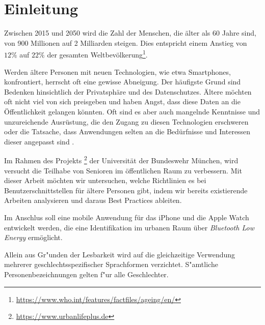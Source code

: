 \chapter{Einleitung}

Zwischen 2015 und 2050 wird die Zahl der Menschen, die älter als 60 Jahre sind, von 900 Millionen auf 2 Milliarden steigen. Dies entspricht einem Anstieg von $ 12 \% $ auf $ 22 \% $ der gesamten Weltbevölkerung\footnote{\url{https://www.who.int/features/factfiles/ageing/en/}}.

Werden ältere Personen mit neuen Technologien, wie etwa Smartphones, konfrontiert, herrscht oft eine gewisse Abneigung. Der häufigste Grund sind Bedenken hinsichtlich der Privatsphäre und des Datenschutzes. Ältere möchten oft nicht viel von sich preisgeben und haben Angst, dass diese Daten an die Öffentlichkeit gelangen könnten. Oft sind es aber auch mangelnde Kenntnisse und unzureichende Ausrüstung, die den Zugang zu diesen Technologien erschweren oder die Tatsache, dass Anwendungen selten an die Bedürfnisse und Interessen dieser angepasst sind \cite{Almeida:2015:Recommendations-for-the-Development-of-Web-Interfaces}\cite{Boll:2015:User-Interfaces-with}\cite{Leonardi:2010:An-Exploratory-Study-of-a-Touch-Based}.

Im Rahmen des Projekts \footnote{\url{https://www.urbanlifeplus.de}} der Universität der Bundeswehr München, wird versucht die Teilhabe von Senioren im öffentlichen Raum zu verbessern. Mit dieser Arbeit möchten wir untersuchen, welche Richtlinien es bei Benutzerschnittstellen für ältere Personen gibt, indem wir bereits existierende Arbeiten analysieren und daraus Best Practices ableiten.

Im Anschlus soll eine mobile Anwendung für das iPhone und die Apple Watch entwickelt werden, die eine Identifikation im urbanen Raum über \emph{Bluetooth Low Energy} ermöglicht.

Allein aus Gr"unden der Lesbarkeit wird auf die gleichzeitige Verwendung mehrerer geschlechtsspezifischer Sprachformen verzichtet. S"amtliche Personenbezeichnungen gelten f"ur alle Geschlechter.
